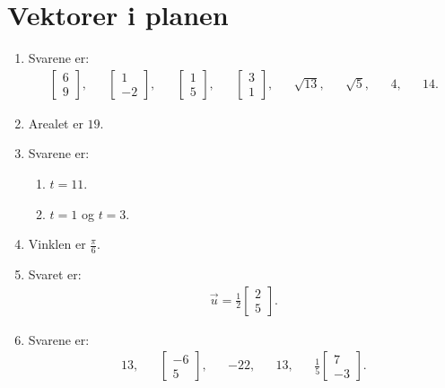\section{Vektorer i planen}
\begin{enumerate}
	\item Svarene er:
	\begin{align*}
	\begin{bmatrix}
	6\\9
	\end{bmatrix},&&\begin{bmatrix}
	1\\-2
	\end{bmatrix},&&\begin{bmatrix}
	1\\5
	\end{bmatrix},&&\begin{bmatrix}
	3\\1
	\end{bmatrix},&&\sqrt{13},&&\sqrt{5},&&4,&& 14.
	\end{align*}
	
	\item Arealet er $19$.
	
	\item Svarene er:
	\begin{enumerate}
		\item $t=11$.
		\item $t=1$ og $t=3$.
	\end{enumerate}
	
	\item Vinklen er $\frac{\pi}{6}$.
	
	\item Svaret er:
	\begin{align*}
	\vec{u}=\frac{1}{2}\begin{bmatrix}
	2\\5
	\end{bmatrix}.
	\end{align*}
	
	\item Svarene er:
	\begin{align*}
	13,&&\begin{bmatrix}
	-6\\5
	\end{bmatrix},&&-22,&&13,&&\frac{1}{5}\begin{bmatrix}
	7\\-3
	\end{bmatrix}
	.
	\end{align*}
	

\end{enumerate}
